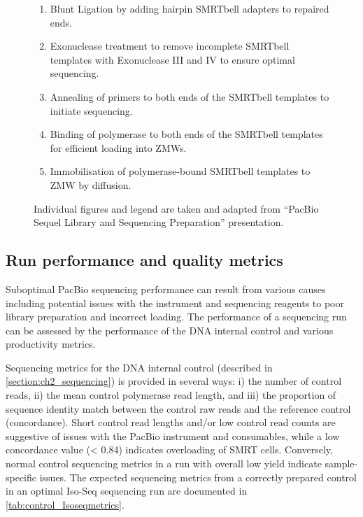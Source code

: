 \begin{figure}[!htp]
{\begin{enumerate}
			\item Blunt Ligation by adding hairpin SMRTbell adapters to repaired ends.
			\item Exonuclease treatment to remove incomplete SMRTbell templates with Exonuclease III and IV to ensure optimal sequencing.
			\item Annealing of primers to both ends of the SMRTbell templates to initiate sequencing. 
			\item Binding of polymerase to both ends of the SMRTbell templates for efficient loading into ZMWs.
			\item Immobilisation of polymerase-bound SMRTbell templates to ZMW by diffusion.
			\\
		\end{enumerate} 
		Individual figures and legend are taken and adapted from “PacBio Sequel Library and Sequencing Preparation” presentation.
	}
	\label{fig:isoseq_labworkflow}
\end{figure}

\clearpage
\subsection{Run performance and quality metrics}
\label{sec: Isoseq_run_performance}
Suboptimal PacBio sequencing performance can result from various causes including potential issues with the instrument and sequencing reagents to poor library preparation and incorrect loading. The performance of a sequencing run can be assessed by the performance of the DNA internal control and various productivity metrics. 

Sequencing metrics for the DNA internal control (described in \cref{section:ch2_sequencing}) is provided in several ways: i) the number of control reads, ii) the mean control polymerase read length, and iii) the proportion of sequence identity match between the control raw reads and the reference control (concordance). Short control read lengths and/or low control read counts are suggestive of issues with the PacBio instrument and consumables, while a low concordance value (< 0.84) indicates overloading of SMRT cells. Conversely, normal control sequencing metrics in a run with overall low yield indicate sample-specific issues. The expected sequencing metrics from a correctly prepared control in an optimal Iso-Seq sequencing run are documented in \cref{tab:control_Isoseqmetrics}. 

